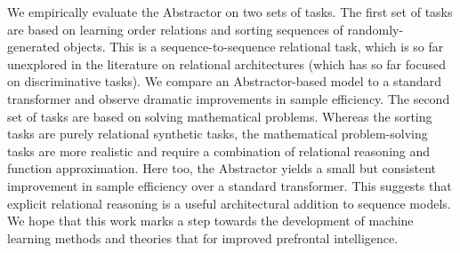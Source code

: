 We empirically evaluate the Abstractor on two sets of tasks. The first set of tasks are based on learning order relations and sorting sequences of randomly-generated objects. This is a sequence-to-sequence relational task, which is so far unexplored in the literature on relational architectures (which has so far focused on discriminative tasks). We compare an Abstractor-based model to a standard transformer and observe dramatic improvements in sample efficiency. The second set of tasks are based on solving mathematical problems. Whereas the sorting tasks are purely relational synthetic tasks, the mathematical problem-solving tasks are more realistic and require a combination of relational reasoning and function approximation. Here too, the Abstractor yields a small but consistent improvement in sample efficiency over a standard transformer. This suggests that explicit relational reasoning is a useful architectural addition to sequence models. We hope that this work marks a step towards the development of machine learning methods and theories that for improved prefrontal intelligence.

